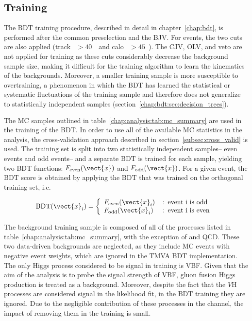 \subsection{Training}

The BDT training procedure, described in detail in
chapter~\ref{chap:bdt}, is performed after the common preselection and
the BJV. For \eemm events, the two \etmiss cuts are also applied
(track \etmiss~$>40$~\gev~and calo \etmiss~$>45$~\gev). The
CJV, OLV, and \Ztautaunody veto are not applied for training as these
cuts considerably decrease the background sample size, making it difficult for
the training algorithm to learn the kinematics of the
backgrounds. Moreover, a smaller training sample is more susceptible to
overtraining, a phenomenon in which the BDT has learned the
statistical or systematic fluctuations of the training sample and therefore does not
generalize to statistically independent samples
(section~\ref{chap:bdt:sec:decision_trees}).

The MC samples outlined in table~\ref{chap:analysis:tab:mc_summary} are used
in the training of the BDT. In order to use all of the available MC
statistics in the analysis, the cross-validation approach described
in section~\ref{subsec:cross_valid} is used. The training set is split
into two statistically independent samples-- even events and odd
events-- and a separate BDT is trained for each sample, yielding two
BDT functions: $F_{\textrm{even}}(\vect{x})$ and
$F_{\textrm{odd}}(\vect{x})$. For a given event, the BDT score is
obtained by applying the BDT that was trained on the orthogonal
training set, i.e.

 \begin{equation}
   \textrm{BDT}(\vect{x}_i) = \left\{
   \begin{array} {ll}
     F_{\textrm{even}}(\vect{x}_i) & \, \textrm{: event i is odd }
     \\
     F_{\textrm{odd}}(\vect{x}_i) & \, \textrm{: event i is even }
    \end{array} \right.
 \end{equation}

The background training sample is composed of all of the processes
listed in table~\ref{chap:analysis:tab:mc_summary}, with the exception of
\wjets and QCD. These two data-driven backgrounds are neglected, as
they include MC events with negative event weights, which are ignored
in the TMVA BDT implementation. The only Higgs process considered to
be signal in training is VBF. Given that the aim of the analysis is to
probe the signal strength of VBF, gluon fusion Higgs production is
treated as a background. Moreover, despite the fact that the $V$H
processes are considered signal in the likelihood fit, in the BDT
training they are ignored. Due to the negligible contribution of these
processes in the \lnln channel, the impact of removing them in the
training is small. 

